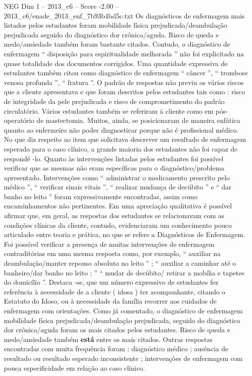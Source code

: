\begin{textsample}{NEG Dim 1 – 2013\_c6 – Score -2.00 – 2013\_c6/enade\_2013\_enf\_7b93b4bd5c.txt}
Os diagnósticos de enfermagem mais listados pelos estudantes foram mobilidade física prejudicada/deambulação prejudicada seguido do diagnóstico dor crônica/aguda.
Risco de queda e medo/ansiedade também foram bastante citados.
Contudo, o diagnóstico de enfermagem “ disposição para espiritualidade melhorada ” não foi explicitado na quase totalidade dos documentos corrigidos.
Uma quantidade expressiva de estudantes também citou como diagnóstico de enfermagem “ câncer ”, “ trombose venosa profunda ”, “ fratura ”.
O padrão de respostas não previu os vários riscos que a cliente apresentava e que foram descritos pelos estudantes tais como : risco de integridade da pele prejudicada e risco de comprometimento do padrão circulatório.
Vários estudantes também se referiram à cliente como em pós-operatório de mastectomia.
Muitos, ainda, se posicionaram de maneira enfática quanto ao enfermeiro não poder diagnosticar porque não é profissional médico.
No que diz respeito ao item que solicitava descrever um resultado de enfermagem esperado para o caso clínico, a grande maioria dos estudantes não foi capaz de respondê -lo.
Quanto às intervenções listadas pelos estudantes foi possível verificar que as mesmas não eram específicas para o diagnóstico/problema apresentado.
Intervenções como “ administrar o medicamento prescrito pelo médico ”, “ verificar sinais vitais ”, “ realizar mudança de decúbito ” e “ dar banho no leito ” foram expressivamente encontradas, assim como encaminhamentos não pertinentes.
Em uma apreciação qualitativa é possível afirmar que, em geral, as respostas dos estudantes se relacionavam com as condições clínicas da cliente, contudo, evidenciaram um conhecimento pouco articulado entre teoria e prática, no que se refere a Diagnósticos de Enfermagem.
Foi possível verificar a presença de muitas intervenções de enfermagem contraditórias em uma mesma resposta como, por exemplo, “ auxiliar na deambulação/manter repouso absoluto no leito ” ; “ auxiliar a caminhar até o banheiro/dar banho no leito ; ” “ mudar de decúbito/ retirar a mobília e tapetes do domicílio ”.
Destaca -se, que um número expressivo de estudantes fez referência à necessidade de a cliente ( idosa ) ter acompanhante, citando o Estatuto do Idoso, ou à necessidade da família recorrer aos cuidados de enfermagem com orientações.
Como já comentado, o diagnóstico de enfermagem mobilidade física prejudicada/deambulação prejudicada, seguido do diagnóstico dor crônica/aguda foram os mais citados pelos estudantes.
Risco de queda e medo/ansiedade também \textbf{está} entre os mais citados.
Outras respostas encontradas com muita frequência foram : diagnóstico médico ; ausência de resultado ou resultado esperado inconsistente ; intervenções de enfermagem com pouca especificidade em relação ao caso clínico.

\end{textsample}
